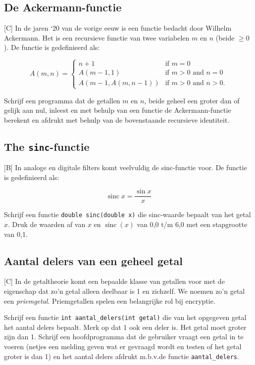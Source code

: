 \documentclass[a4paper,10pt,fleqn,twoside]{article}
\DeclareMathOperator{\sinc}{sinc}
\begin{document}
\subsection{De Ackermann-functie}[C]
In de jaren `20 van de vorige eeuw is een functie bedacht door Wilhelm Ackermann. Het is een recursieve functie van twee variabelen $m$ en $n$ (beide $\geq 0$). De functie is gedefinieerd als:

\begin{equation*}
A(m, n) =
\begin{cases}
n+1 & \mbox{if } m = 0 \\
A(m-1, 1) & \mbox{if } m > 0 \mbox{ and } n = 0 \\
A(m-1, A(m, n-1)) & \mbox{if } m > 0 \mbox{ and } n > 0.
\end{cases}
\end{equation*}

Schrijf een programma dat de getallen $m$ en $n$, beide geheel een groter dan of gelijk aan nul, inleest en met behulp van een functie de Ackermann-functie berekent en afdrukt met behulp van de bovenstaande recursieve identiteit.

\subsection{The \texttt{sinc}-functie}[B]
In analoge en digitale filters komt veelvuldig de sinc-functie voor. De functie is gedefinieerd als:

\begin{equation*}
\sinc x= \dfrac{\sin x}{x}
\end{equation*}

Schrijf een functie \lstinline|double sinc(double x)| die sinc-waarde bepaalt van het getal $x$. Druk de waarden af van $x$ en $\sinc(x)$ van 0,0 t/m 6,0 met een stapgrootte van 0,1.

\subsection{Aantal delers van een geheel getal}[C]
In de getaltheorie komt een bepaalde klasse van getallen voor met de eigenschap dat zo'n getal alleen deelbaar is 1 en zichzelf. We noemen zo'n getal een \textsl{priemgetal}. Priemgetallen spelen een belangrijke rol bij encryptie.

Schrijf een functie \lstinline|int aantal_delers(int getal)| die van het opgegeven getal het aantal delers bepaalt. Merk op dat 1 ook een deler is. Het getal moet groter zijn dan 1. Schrijf een hoofdprogramma dat de gebruiker vraagt een getal in te voeren (netjes een melding geven wat er gevraagd wordt en testen of het getal groter is dan 1) en het aantal delers afdrukt m.b.v.\@ de functie \lstinline|aantal_delers|.
\end{document}
